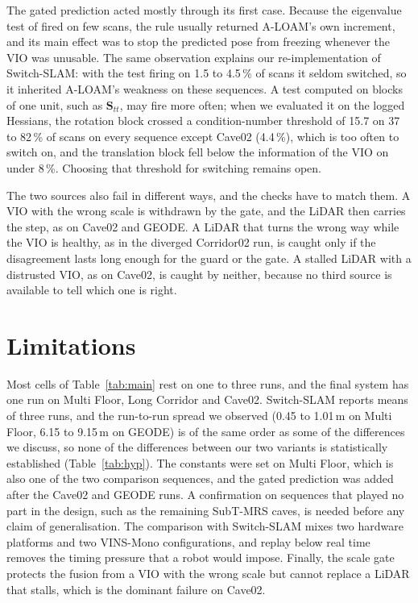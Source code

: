 \documentclass[journal]{IEEEtran}
\begin{document}
The gated prediction acted mostly through its first case. Because the eigenvalue test of \cite{switchslam2024} fired on few scans, the rule usually returned A-LOAM's own increment, and its main effect was to stop the predicted pose from freezing whenever the VIO was unusable. The same observation explains our re-implementation of Switch-SLAM: with the test firing on 1.5 to 4.5\,\% of scans it seldom switched, so it inherited A-LOAM's weakness on these sequences. A test computed on blocks of one unit, such as $\mathbf S_{tt}$, may fire more often; when we evaluated it on the logged Hessians, the rotation block crossed a condition-number threshold of 15.7 on 37 to 82\,\% of scans on every sequence except Cave02 (4.4\,\%), which is too often to switch on, and the translation block fell below the information of the VIO on under 8\,\%. Choosing that threshold for switching remains open.

The two sources also fail in different ways, and the checks have to match them. A VIO with the wrong scale is withdrawn by the gate, and the LiDAR then carries the step, as on Cave02 and GEODE. A LiDAR that turns the wrong way while the VIO is healthy, as in the diverged Corridor02 run, is caught only if the disagreement lasts long enough for the guard or the gate. A stalled LiDAR with a distrusted VIO, as on Cave02, is caught by neither, because no third source is available to tell which one is right.

\section{Limitations}
Most cells of Table~\ref{tab:main} rest on one to three runs, and the final system has one run on Multi Floor, Long Corridor and Cave02. Switch-SLAM reports means of three runs, and the run-to-run spread we observed (0.45 to 1.01\,m on Multi Floor, 6.15 to 9.15\,m on GEODE) is of the same order as some of the differences we discuss, so none of the differences between our two variants is statistically established (Table~\ref{tab:hyp}). The constants were set on Multi Floor, which is also one of the two comparison sequences, and the gated prediction was added after the Cave02 and GEODE runs. A confirmation on sequences that played no part in the design, such as the remaining SubT-MRS caves, is needed before any claim of generalisation. The comparison with Switch-SLAM mixes two hardware platforms and two VINS-Mono configurations, and replay below real time removes the timing pressure that a robot would impose. Finally, the scale gate protects the fusion from a VIO with the wrong scale but cannot replace a LiDAR that stalls, which is the dominant failure on Cave02.
\end{document}
